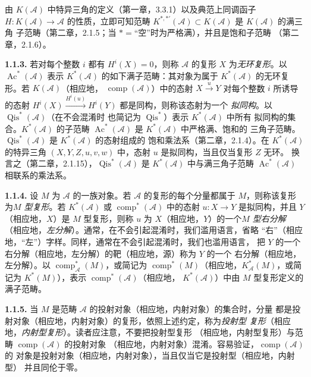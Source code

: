 \clearpage
{}%
\begingroup\small\setlength{\parskip}{0pt}\setlength{\emergencystretch}{1.5em}
\setlength{\abovedisplayskip}{4pt plus 2pt minus 2pt}%
\setlength{\belowdisplayskip}{4pt plus 2pt minus 2pt}%

由 $K(\mathcal A)$ 中特异三角的定义（第一章，3.3.1）以及典范上同调函子
$H\colon K(\mathcal A)\longrightarrow\mathcal A$ 的性质，立即可知范畴
$K^{*,*'}(\mathcal A)\subset K(\mathcal A)$ 是 $K(\mathcal A)$ 的满三角
子范畴（第二章，2.1.5；当 $*={}$“空”时为严格满），并且是饱和子范畴
（第二章，2.1.6）。

\medskip\noindent\textbf{1.1.3.}\quad
若对每个整数 $i$ 都有 $H^i(X)=0$，则称 $\mathcal A$ 的复形 $X$
为\emph{无环复形}。以 $\operatorname{Ac}^{*}(\mathcal A)$ 表示
$K^{*}(\mathcal A)$ 的如下满子范畴：其对象为属于
$K^{*}(\mathcal A)$ 的无环复形。若 $K(\mathcal A)$（相应地，
$\operatorname{comp}(\mathcal A)$）中的态射
$X\xrightarrow{u}Y$ 对每个整数 $i$ 所诱导的态射
$H^i(X)\xrightarrow{H^i(u)}H^i(Y)$ 都是同构，则称该态射为一个
\emph{拟同构}。以 $\operatorname{Qis}^{*}(\mathcal A)$（在不会混淆时
也简记为 $\operatorname{Qis}^{*}$）表示 $K^{*}(\mathcal A)$ 中所有
拟同构的集合。$K^{*}(\mathcal A)$ 的子范畴
$\operatorname{Ac}^{*}(\mathcal A)$ 是 $K^{*}(\mathcal A)$ 中严格满、饱和的
三角子范畴。
$\operatorname{Qis}^{*}(\mathcal A)$ 是 $K^{*}(\mathcal A)$ 的态射组成的
饱和乘法系（第二章，2.1.4）。在 $K^{*}(\mathcal A)$ 的特异三角
$(X,Y,Z,u,v,w)$ 中，态射 $u$ 是拟同构，当且仅当复形 $Z$ 无环。
换言之（第二章，2.1.15），$\operatorname{Qis}^{*}(\mathcal A)$ 是
$K^{*}(\mathcal A)$ 中与满三角子范畴
$\operatorname{Ac}^{*}(\mathcal A)$ 相联系的乘法系。

\medskip\noindent\textbf{1.1.4.}\quad
设 $M$ 为 $\mathcal A$ 的一族对象。若 $\mathcal A$ 的复形的每个分量都属于
$M$，则称该复形为\emph{$M$ 型复形}。若 $K^{*}(\mathcal A)$ 或
$\operatorname{comp}^{*}(\mathcal A)$ 中的态射
$u\colon X\longrightarrow Y$ 是拟同构，并且 $Y$（相应地，$X$）是
$M$ 型复形，则称 $u$ 为 $X$（相应地，$Y$）的一个\emph{$M$ 型右分解}
（相应地，\emph{左分解}）。通常，在不会引起混淆时，我们滥用语言，省略
“右”（相应地，“左”）字样。同样，通常在不会引起混淆时，我们也滥用语言，
把 $Y$ 的一个右分解（相应地，左分解）的靶（相应地，源）称为 $Y$ 的一个
右分解（相应地，左分解）。以
$\operatorname{comp}_{\mathcal A}^{*}(M)$，或简记为
$\operatorname{comp}^{*}(M)$（相应地，$K_{\mathcal A}^{*}(M)$，或简记为
$K^{*}(M)$），表示 $\operatorname{comp}^{*}(\mathcal A)$（相应地，
$K^{*}(\mathcal A)$）中由 $M$ 型复形定义的满子范畴。

\medskip\noindent\textbf{1.1.5.}\quad
当 $M$ 是范畴 $\mathcal A$ 的投射对象（相应地，内射对象）的集合时，分量
都是投射对象（相应地，内射对象）的复形，依照上述约定，称为\emph{投射型
复形}（相应地，\emph{内射型复形}）。读者应注意，不要把投射型复形
（相应地，内射型复形）与范畴 $\operatorname{comp}(\mathcal A)$ 的投射对象
（相应地，内射对象）混淆。容易验证，$\operatorname{comp}(\mathcal A)$ 的
对象是投射对象（相应地，内射对象），当且仅当它是投射型（相应地，内射型）
并且同伦于零。
\endgroup
